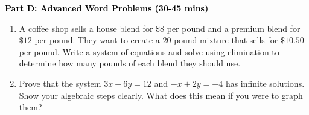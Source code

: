 \documentclass[12pt, letterpaper, fleqn]{article}
\begin{document}
\newpage

\begin{tcolorbox}[colback=customteal!20]
\large\textcolor{black}{\textbf{Part D: Advanced Word Problems (30-45 mins)}}
\end{tcolorbox}

\vspace{3mm}

\begin{enumerate}[itemsep=5.5cm, leftmargin=0.6cm, resume]
\item A coffee shop sells a house blend for $\$8$ per pound and a premium blend for $\$12$ per pound. They want to create a $20\text{-pound}$ mixture that sells for $\$10.50$ per pound. Write a system of equations and solve using elimination to determine how many pounds of each blend they should use.
\item Prove that the system $3x - 6y = 12$ and $-x + 2y = -4$ has infinite solutions. Show your algebraic steps clearly. What does this mean if you were to graph them?
\end{enumerate}
\end{document}
